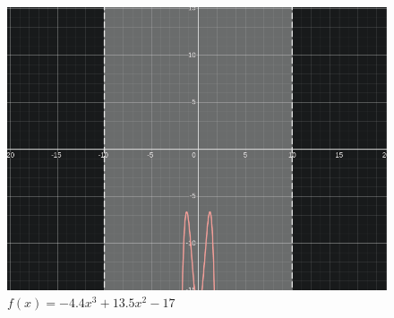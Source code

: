 \documentclass{article}
\begin{document}
\begin{figure}[H]
    \centering
    \includegraphics[width=\textwidth]{"../assets/f_1.png"}
    \caption{$f(x) = -4.4x^3 + 13.5x^2 - 17 $}
    \label{fig:f_1}
\end{figure}
  
\end{document}
